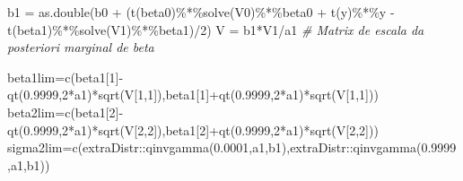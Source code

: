 \documentclass[
]{book}
\newenvironment{Shaded}{\begin{snugshade}}{\end{snugshade}}
\newcommand{\CommentTok}[1]{\textcolor[rgb]{0.56,0.35,0.01}{\textit{#1}}}
\newcommand{\DecValTok}[1]{\textcolor[rgb]{0.00,0.00,0.81}{#1}}
\newcommand{\FloatTok}[1]{\textcolor[rgb]{0.00,0.00,0.81}{#1}}
\newcommand{\FunctionTok}[1]{\textcolor[rgb]{0.00,0.00,0.00}{#1}}
\newcommand{\NormalTok}[1]{#1}
\newcommand{\OtherTok}[1]{\textcolor[rgb]{0.56,0.35,0.01}{#1}}
\newcommand{\SpecialCharTok}[1]{\textcolor[rgb]{0.00,0.00,0.00}{#1}}
\begin{document}
\begin{Shaded}
\begin{Highlighting}[]
\NormalTok{b1 }\OtherTok{=} \FunctionTok{as.double}\NormalTok{(b0 }\SpecialCharTok{+}\NormalTok{ (}\FunctionTok{t}\NormalTok{(beta0)}\SpecialCharTok{\%*\%}\FunctionTok{solve}\NormalTok{(V0)}\SpecialCharTok{\%*\%}\NormalTok{beta0 }\SpecialCharTok{+} \FunctionTok{t}\NormalTok{(y)}\SpecialCharTok{\%*\%}\NormalTok{y }\SpecialCharTok{{-}} \FunctionTok{t}\NormalTok{(beta1)}\SpecialCharTok{\%*\%}\FunctionTok{solve}\NormalTok{(V1)}\SpecialCharTok{\%*\%}\NormalTok{beta1)}\SpecialCharTok{/}\DecValTok{2}\NormalTok{)}
\NormalTok{V }\OtherTok{=}\NormalTok{ b1}\SpecialCharTok{*}\NormalTok{V1}\SpecialCharTok{/}\NormalTok{a1 }\CommentTok{\# Matrix de escala da posteriori marginal de beta}

\NormalTok{beta1lim}\OtherTok{=}\FunctionTok{c}\NormalTok{(beta1[}\DecValTok{1}\NormalTok{]}\SpecialCharTok{{-}}\FunctionTok{qt}\NormalTok{(}\FloatTok{0.9999}\NormalTok{,}\DecValTok{2}\SpecialCharTok{*}\NormalTok{a1)}\SpecialCharTok{*}\FunctionTok{sqrt}\NormalTok{(V[}\DecValTok{1}\NormalTok{,}\DecValTok{1}\NormalTok{]),beta1[}\DecValTok{1}\NormalTok{]}\SpecialCharTok{+}\FunctionTok{qt}\NormalTok{(}\FloatTok{0.9999}\NormalTok{,}\DecValTok{2}\SpecialCharTok{*}\NormalTok{a1)}\SpecialCharTok{*}\FunctionTok{sqrt}\NormalTok{(V[}\DecValTok{1}\NormalTok{,}\DecValTok{1}\NormalTok{]))}
\NormalTok{beta2lim}\OtherTok{=}\FunctionTok{c}\NormalTok{(beta1[}\DecValTok{2}\NormalTok{]}\SpecialCharTok{{-}}\FunctionTok{qt}\NormalTok{(}\FloatTok{0.9999}\NormalTok{,}\DecValTok{2}\SpecialCharTok{*}\NormalTok{a1)}\SpecialCharTok{*}\FunctionTok{sqrt}\NormalTok{(V[}\DecValTok{2}\NormalTok{,}\DecValTok{2}\NormalTok{]),beta1[}\DecValTok{2}\NormalTok{]}\SpecialCharTok{+}\FunctionTok{qt}\NormalTok{(}\FloatTok{0.9999}\NormalTok{,}\DecValTok{2}\SpecialCharTok{*}\NormalTok{a1)}\SpecialCharTok{*}\FunctionTok{sqrt}\NormalTok{(V[}\DecValTok{2}\NormalTok{,}\DecValTok{2}\NormalTok{]))}
\NormalTok{sigma2lim}\OtherTok{=}\FunctionTok{c}\NormalTok{(extraDistr}\SpecialCharTok{::}\FunctionTok{qinvgamma}\NormalTok{(}\FloatTok{0.0001}\NormalTok{,a1,b1),extraDistr}\SpecialCharTok{::}\FunctionTok{qinvgamma}\NormalTok{(}\FloatTok{0.9999}\NormalTok{,a1,b1))}


\end{Highlighting}
\end{Shaded}
\end{document}
